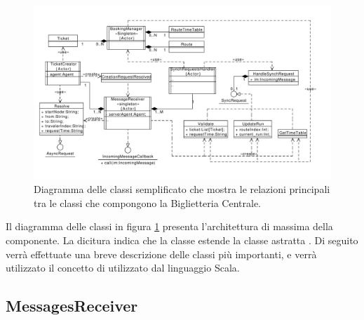 	\begin{figure}[htbp]
		\includegraphics[scale=0.5,trim= 35mm 0mm 0mm 0mm]{imgs/ticket_office_class.pdf}
		\caption{\footnotesize{Diagramma delle classi semplificato che mostra le relazioni principali tra le classi che compongono la Biglietteria Centrale.}}
		\label{img:ticket_office_class_diagram}
	\end{figure}
	
	Il diagramma delle classi in figura \ref{img:ticket_office_class_diagram} presenta l'architettura di massima della componente. La dicitura  indica che la classe estende la classe astratta . Di seguito verrà effettuate una breve descrizione delle classi più importanti, e verrà utilizzato il concetto di  utilizzato dal linguaggio Scala.
	
	\subsection{MessagesReceiver}
	
